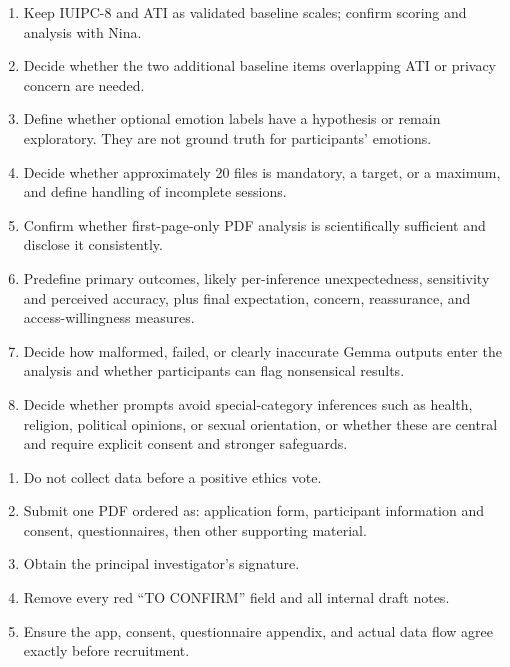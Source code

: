 \documentclass[10pt]{article}
\begin{document}
\begin{enumerate}
  \item Keep IUIPC-8 and ATI as validated baseline scales; confirm scoring and analysis with Nina.
  \item Decide whether the two additional baseline items overlapping ATI or privacy concern are needed.
  \item Define whether optional emotion labels have a hypothesis or remain exploratory. They are not ground truth for participants' emotions.
  \item Decide whether approximately 20 files is mandatory, a target, or a maximum, and define handling of incomplete sessions.
  \item Confirm whether first-page-only PDF analysis is scientifically sufficient and disclose it consistently.
  \item Predefine primary outcomes, likely per-inference unexpectedness, sensitivity and perceived accuracy, plus final expectation, concern, reassurance, and access-willingness measures.
  \item Decide how malformed, failed, or clearly inaccurate Gemma outputs enter the analysis and whether participants can flag nonsensical results.
  \item Decide whether prompts avoid special-category inferences such as health, religion, political opinions, or sexual orientation, or whether these are central and require explicit consent and stronger safeguards.
\end{enumerate}

\begin{enumerate}
  \item Do not collect data before a positive ethics vote.
  \item Submit one PDF ordered as: application form, participant information and consent, questionnaires, then other supporting material.
  \item Obtain the principal investigator's signature.
  \item Remove every red ``TO CONFIRM'' field and all internal draft notes.
  \item Ensure the app, consent, questionnaire appendix, and actual data flow agree exactly before recruitment.
\end{enumerate}
\end{document}
